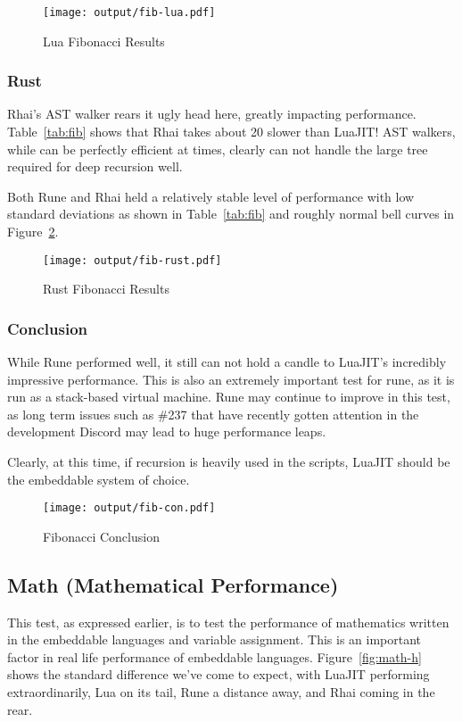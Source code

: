 \begin{figure}[H]
	\centering
		\texttt{[image: output/fib-lua.pdf]}
	\caption{Lua Fibonacci Results}
	\label{fig:fib-lua}
\end{figure}

\subsubsection{Rust}
Rhai's AST walker\cite{rhai:walker} rears it ugly head here, greatly impacting performance. Table~\ref{tab:fib} shows that Rhai takes about 20 slower than LuaJIT! AST walkers, while can be perfectly efficient at times, clearly can not handle the large tree required for deep recursion well.

Both Rune and Rhai held a relatively stable level of performance with low standard deviations as shown in Table~\ref{tab:fib} and roughly normal bell curves in Figure~\ref{fig:fib-rust}.

\begin{figure}[H]
	\centering
		\texttt{[image: output/fib-rust.pdf]}
	\caption{Rust Fibonacci Results}
	\label{fig:fib-rust}
\end{figure}

\subsubsection{Conclusion}
While Rune performed well, it still can not hold a candle to LuaJIT's incredibly impressive performance. This is also an extremely important test for rune, as it is run as a stack-based virtual machine.\cite{rune:stack} Rune may continue to improve in this test, as long term issues such as \#237\cite{rune:JIT} that have recently gotten attention in the development Discord may lead to huge performance leaps.

Clearly, at this time, if recursion is heavily used in the scripts, LuaJIT should be the embeddable system of choice.

\begin{figure}[H]
	\centering
		\texttt{[image: output/fib-con.pdf]}
	\caption{Fibonacci Conclusion}
	\label{fig:fib-con}
\end{figure}

\subsection{Math (Mathematical Performance)} \label{sec:analysis:math}
This test, as expressed earlier, is to test the performance of mathematics written in the embeddable languages and variable assignment. This is an important factor in real life performance of embeddable languages. Figure~\ref{fig:math-h} shows the standard difference we've come to expect, with LuaJIT performing extraordinarily, Lua on its tail, Rune a distance away, and Rhai coming in the rear.

